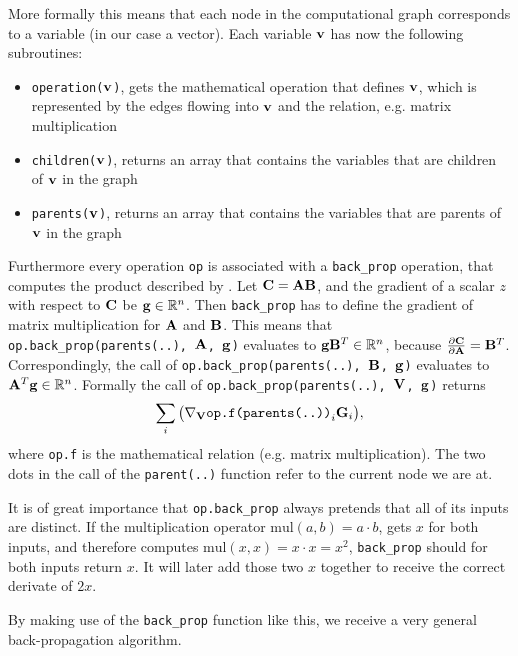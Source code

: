 More formally this means that each node in the computational graph corresponds to a variable (in our case a vector).
Each variable \(\mathbf{v}\) has now the following subroutines:
\begin{itemize}
    \item \texttt{operation(\(\mathbf{v}\))}, gets the mathematical operation that defines \(\mathbf{v}\),
    which is represented by the edges flowing into \(\mathbf{v}\) and the relation, e.g. matrix multiplication
    \item \texttt{children(\(\mathbf{v}\))}, returns an array that contains the variables that are children of \(\mathbf{v}\) in the graph
    \item \texttt{parents(\(\mathbf{v}\))}, returns an array that contains the variables that are parents of \(\mathbf{v}\) in the graph 
\end{itemize}
Furthermore every operation \texttt{op} is associated with a \texttt{back\_prop} operation, that computes the product described by .
Let \(\mathbf{C} = \mathbf{AB}\), and the gradient of a scalar \(z\) with respect to \(\mathbf{C}\) be \(\mathbf{g} \in \mathbb{R}^n\).
Then \texttt{back\_prop} has to define the gradient of matrix multiplication for \(\mathbf{A}\) and \(\mathbf{B}\).
This means that \texttt{op.back\_prop(parents(..), \(\mathbf{A}\), \(\mathbf{g}\))} evaluates to \(\mathbf{g}\mathbf{B}^T \in \mathbb{R}^n\), because \(\frac{\partial \mathbf{C}}{\partial \mathbf{A}} = \mathbf{B}^T\).
Correspondingly, the call of \texttt{op.back\_prop(parents(..), \(\mathbf{B}\), \(\mathbf{g}\))} evaluates to \(\mathbf{A}^T\mathbf{g} \in \mathbb{R}^n\).
Formally the call of \texttt{op.back\_prop(parents(..), \(\mathbf{V}\), \(\mathbf{g}\))} returns
\begin{equation}
    \sum_{i} \big( \nabla_{\mathbf{V}} \texttt{op.f(parents(..))}_{i} \mathbf{G}_{i} \big),
\end{equation}
where \texttt{op.f} is the mathematical relation (e.g. matrix multiplication).
The two dots in the call of the \texttt{parent(..)} function refer to the current node we are at.

It is of great importance that \texttt{op.back\_prop} always pretends that all of its inputs are distinct.
If the multiplication operator \(\text{mul}(a,b) = a \cdot b\), gets \(x\) for both inputs, and therefore computes \(\text{mul}(x,x)= x \cdot x = x^2\), 
\texttt{back\_prop} should for both inputs return \(x\).
It will later add those two \(x\) together to receive the correct derivate of \(2x\).

By making use of the \texttt{back\_prop} function like this, we receive a very general back-propagation algorithm. \\

